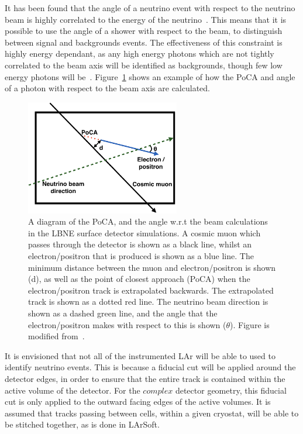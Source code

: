 It has been found that the angle of a neutrino event with respect to the neutrino beam is highly correlated to the energy of the neutrino~\citep{barker2012muon}. This means that it is possible to use the angle of a shower with respect to the beam, to distinguish between signal and backgrounds events. The effectiveness of this constraint is highly energy dependant, as any high energy photons which are not tightly correlated to the beam axis will be identified as backgrounds, though few low energy photons will be~\citep{LBNE6621}. Figure~\ref{fig:SurfPoCACut} shows an example of how the PoCA and angle of a photon with respect to the beam axis are calculated. \\

\begin{figure}
  \centering
  \includegraphics[width=0.6\textwidth]{PoCA_Beam_Cuts}
  \caption[A diagram of the PoCA, and the angle w.r.t the beam calculations in the LBNE surface detector simulations]
          {A diagram of the PoCA, and the angle w.r.t the beam calculations in the LBNE surface detector simulations. A cosmic muon which passes through the detector is shown as a black line, whilst an electron/positron that is produced is shown as a blue line. The minimum distance between the muon and electron/positron is shown (d), as well as the point of closest approach (PoCA) when the electron/positron track is extrapolated backwards. The extrapolated track is shown as a dotted red line. The neutrino beam direction is shown as a dashed green line, and the angle that the electron/positron makes with respect to this is shown ($\theta$). Figure is modified from~\citep{MartinsThesis}.}
  \label{fig:SurfPoCACut}
\end{figure}

It is envisioned that not all of the instrumented LAr will be able to used to identify neutrino events. This is because a fiducial cut will be applied around the detector edges, in order to ensure that the entire track is contained within the active volume of the detector. For the $complex$ detector geometry, this fiducial cut is only applied to the outward facing edges of the active volumes. It is assumed that tracks passing between cells, within a given cryostat, will be able to be stitched together, as is done in LArSoft. \\

